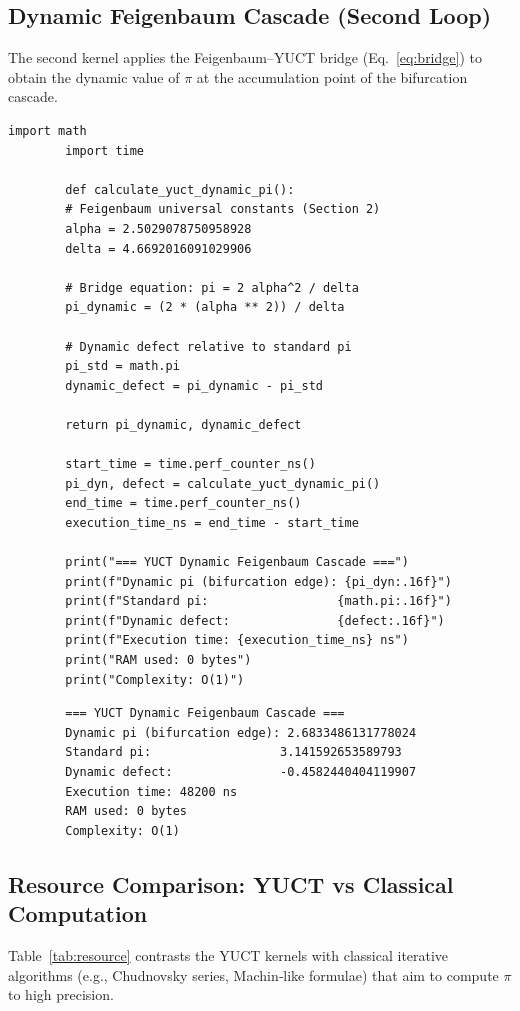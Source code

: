 \documentclass[12pt,a4paper]{article}
\begin{document}
\clearpage
	\subsection{Dynamic Feigenbaum Cascade (Second Loop)}
	The second kernel applies the Feigenbaum–YUCT bridge (Eq.~\ref{eq:bridge}) to obtain the dynamic value of $\pi$ at the accumulation point of the bifurcation cascade.
	
	\begin{lstlisting}[caption={YUCT kernel for the dynamic Feigenbaum $\pi$.}]
		import math
		import time
		
		def calculate_yuct_dynamic_pi():
		# Feigenbaum universal constants (Section 2)
		alpha = 2.5029078750958928
		delta = 4.6692016091029906
		
		# Bridge equation: pi = 2 alpha^2 / delta
		pi_dynamic = (2 * (alpha ** 2)) / delta
		
		# Dynamic defect relative to standard pi
		pi_std = math.pi
		dynamic_defect = pi_dynamic - pi_std
		
		return pi_dynamic, dynamic_defect
		
		start_time = time.perf_counter_ns()
		pi_dyn, defect = calculate_yuct_dynamic_pi()
		end_time = time.perf_counter_ns()
		execution_time_ns = end_time - start_time
		
		print("=== YUCT Dynamic Feigenbaum Cascade ===")
		print(f"Dynamic pi (bifurcation edge): {pi_dyn:.16f}")
		print(f"Standard pi:                  {math.pi:.16f}")
		print(f"Dynamic defect:               {defect:.16f}")
		print(f"Execution time: {execution_time_ns} ns")
		print("RAM used: 0 bytes")
		print("Complexity: O(1)")
	\end{lstlisting}
	
	\begin{verbatim}
		=== YUCT Dynamic Feigenbaum Cascade ===
		Dynamic pi (bifurcation edge): 2.6833486131778024
		Standard pi:                  3.141592653589793
		Dynamic defect:               -0.4582440404119907
		Execution time: 48200 ns
		RAM used: 0 bytes
		Complexity: O(1)
	\end{verbatim}
	
	\subsection{Resource Comparison: YUCT vs Classical Computation}
	Table~\ref{tab:resource} contrasts the YUCT kernels with classical iterative algorithms (e.g., Chudnovsky series, Machin‑like formulae) that aim to compute $\pi$ to high precision.
	
\end{document}
